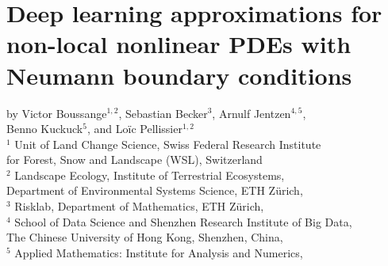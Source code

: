 \graphicspath{{./content/part_II/NonlocalPDE/figures/}}


\chapter{Deep learning approximations for non-local nonlinear PDEs with Neumann boundary conditions}
\label{sec:nonlocalPDE}

by Victor Boussange$^{1,2}$, 
Sebastian Becker$^{3}$,
Arnulf Jentzen$^{4,5}$,\\
Benno Kuckuck$^{5}$,
and 
Lo{\"i}c Pellissier$^{1,2}$\bigskip
\\
\small{$^1$ Unit of Land Change Science, Swiss Federal Research Institute}
\vspace{-0.1cm}\\
\small{for Forest, Snow and Landscape (WSL), Switzerland}
\smallskip
\\
\small{$^2$ Landscape Ecology, Institute of Terrestrial Ecosystems,}
\vspace{-0.1cm}\\
\small{Department of Environmental Systems Science, ETH Z\"urich,}
\smallskip
\\
\small{$^3$ Risklab, Department of Mathematics, ETH Z\"urich,}
\smallskip
\\
\small{$^4$ School of Data Science and Shenzhen Research Institute of Big Data,}
\vspace{-0.1cm}\\
\small{The Chinese University of Hong Kong, Shenzhen, China,}
\smallskip
\\
\small{$^5$ Applied Mathematics: Institute for Analysis and Numerics,}
\vspace{-0.1cm}\\
